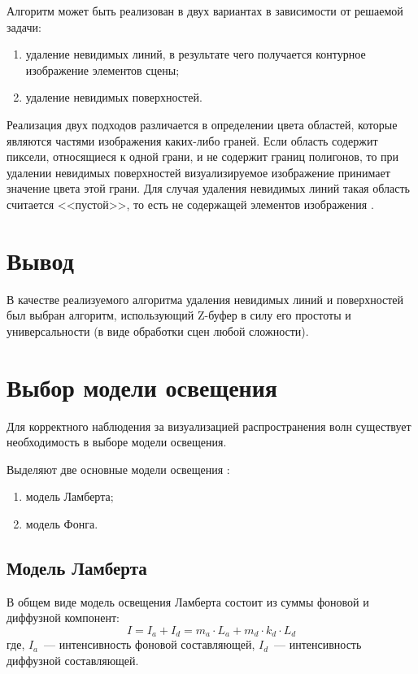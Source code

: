 Алгоритм может быть реализован в двух вариантах в зависимости от решаемой задачи:
\begin{enumerate}
	\item удаление невидимых линий, в результате чего получается контурное изображение элементов сцены;
	\item удаление невидимых поверхностей.
\end{enumerate}

Реализация двух подходов различается в определении цвета областей, которые являются частями изображения каких-либо граней. 
Если область содержит пиксели, относящиеся к одной грани, и не содержит границ полигонов, то при удалении невидимых поверхностей визуализируемое изображение принимает значение цвета этой грани.
Для случая удаления невидимых линий такая область считается <<пустой>>, то есть не содержащей элементов изображения \cite{base}.

\section*{Вывод}

В качестве реализуемого алгоритма удаления невидимых линий и поверхностей был выбран алгоритм, использующий Z-буфер в силу его простоты и универсальности (в виде обработки сцен любой сложности).

\clearpage

\section{Выбор модели освещения}

Для корректного наблюдения за визуализацией распространения волн существует необходимость в выборе модели освещения.

Выделяют две основные модели освещения \cite{baseLight}:
\begin{enumerate}
	\item модель Ламберта;
	\item модель Фонга.
\end{enumerate}

\subsection{Модель Ламберта}

В общем виде модель освещения Ламберта состоит из суммы фоновой и диффузной компонент:
\begin{equation}\label{equ:lambert}
	I = I_{a} + I_{d} = m_{a} \cdot L_{a} + m_{d} \cdot k_{d} \cdot L_{d}
\end{equation}
где, $I_{a}$~--- интенсивность фоновой составляющей,
\newline $I_{d}$~--- интенсивность диффузной составляющей.

